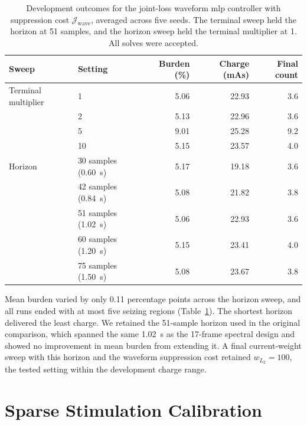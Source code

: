 \begin{table}
  \centering
  \caption{Development outcomes for the joint-loss waveform \ac{mlp} controller with suppression cost \(\mathcal J_{\mathrm{wave}}\), averaged across five seeds.
  The terminal sweep held the horizon at 51 samples, and the horizon sweep held the terminal multiplier at 1.
  All solves were accepted.}\label{tab:waveform_horizon_terminal}
  \begin{tabular}{@{}llrrr@{}}
    \toprule
    Sweep & Setting & Burden (\%) & Charge (mAs) & Final count \\
    \midrule
    Terminal multiplier & 1 & 5.06 & 22.93 & 3.6 \\
                        & 2 & 5.13 & 22.96 & 3.6 \\
                        & 5 & 9.01 & 25.28 & 9.2 \\
                        & 10 & 5.15 & 23.57 & 4.0 \\
    \addlinespace
    Horizon & 30 samples (\SI{0.60}{\second}) & 5.17 & 19.18 & 3.6 \\
            & 42 samples (\SI{0.84}{\second}) & 5.08 & 21.82 & 3.8 \\
            & 51 samples (\SI{1.02}{\second}) & 5.06 & 22.93 & 3.6 \\
            & 60 samples (\SI{1.20}{\second}) & 5.15 & 23.41 & 4.0 \\
            & 75 samples (\SI{1.50}{\second}) & 5.08 & 23.67 & 3.8 \\
    \bottomrule
  \end{tabular}
\end{table}

Mean burden varied by only 0.11 percentage points across the horizon sweep, and all runs ended with at most five seizing regions (Table~\ref{tab:waveform_horizon_terminal}).
The shortest horizon delivered the least charge.
We retained the 51-sample horizon used in the original comparison, which spanned the same \SI{1.02}{\second} as the 17-frame spectral design and showed no improvement in mean burden from extending it.
A final current-weight sweep with this horizon and the waveform suppression cost retained \(w_{L_2}=100\), the tested setting within the development charge range.

\FloatBarrier
\section{Sparse Stimulation Calibration}\label{sec:sparse_calibration}

